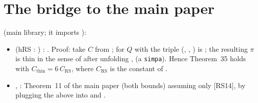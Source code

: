 \section{The bridge to the main paper}
 (main library; it imports
):
\begin{itemize}
\item {} (hRS : ) :
  . Proof: take $C$ from ; for $Q$ with 
  the triple (, , ) is ; the resulting $\pi$ is thin
  in the sense of  after unfolding ,  (a \texttt{simpa}).
  Hence Theorem~35 holds with $C_{\mathrm{thin}}=6\,C_{\mathrm{RS}}$, where $C_{\mathrm{RS}}$ is the constant of
  .
\item {}, : Theorem~11 of the main
  paper (both bounds) assuming only [RS14], by plugging the above into
   and .
\end{itemize}

